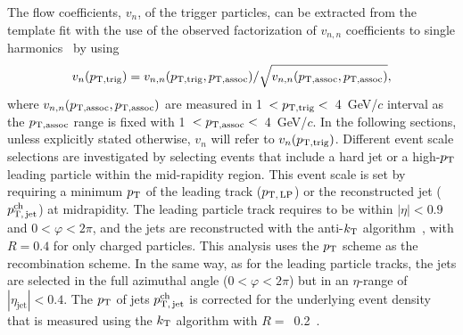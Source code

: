 

The flow coefficients, $v_{n}$, of the trigger particles, can be extracted from the template fit with the use of the observed factorization of $v_{n,n}$ coefficients to single harmonics~\cite{ATLAS:2015hzw,ATLAS:2016yzd} by using
\begin{eqnarray}
v_{n}(p_{\rm{T,trig}}) = v_{n,n}(p_{\rm{T,trig}}, p_{\rm{T,assoc}}) / \sqrt{ v_{n,n}(p_{\rm{T,assoc}},p_{\rm{T,assoc}})},
\end{eqnarray}
where $v_{n,n}(p_{\rm{T,assoc}}, p_{\rm{T,assoc}})$ are measured in 1~$<p_{\rm{T,trig}}<$~4~GeV/$c$ interval as the $p_{\rm{T,assoc}}$ range is fixed with 1~$<p_{\rm{T,assoc}}<$~4~GeV/$c$. In the following sections, unless explicitly stated otherwise, $v_n$ will refer to $v_n(p_{\rm{T,trig}})$.
Different event scale selections are investigated by selecting events that include a hard jet or a high-$p_\mathrm{T}$ leading particle within the mid-rapidity region.
This event scale is set by requiring a minimum $p_\mathrm{T}$ of the leading track ($p_\mathrm{T,\,LP}$) or the reconstructed jet ($p_\mathrm{T,\,jet}^\mathrm{ch}$) at midrapidity. The leading particle track requires to be within $|\eta|<0.9$ and $0<\varphi<2\pi$, and the jets are reconstructed with the anti-$k_{\rm{T}}$ algorithm~\cite{Cacciari:2008gp,Cacciari:2011ma}, with $R=0.4$ for only charged particles. This analysis uses the $p_\mathrm{T}$ scheme as the recombination scheme. In the same way, as for the leading particle tracks, the jets are selected in the full azimuthal angle ($0<\varphi<2\pi$) but in an $\eta$-range of $|\eta_\mathrm{jet}|<0.4$. The $p_\mathrm{T}$ of jets $p_\mathrm{T,\,jet}^\mathrm{ch}$ is corrected for the underlying event density that is measured using the $k_{\rm{T}}$ algorithm with $R=$~0.2~\cite{Acharya:2018eat}.

